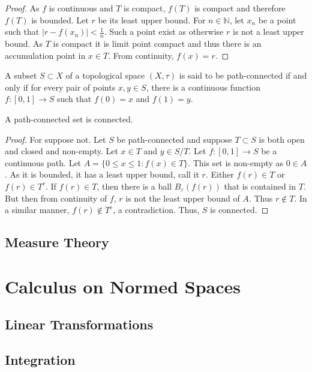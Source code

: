 \documentclass[crop=false,class=book,oneside]{standalone}
\begin{document}
            \begin{proof}
            As $f$ is continuous and $T$ is compact, $f(T)$ is compact and therefore $f(T)$ is bounded. Let $r$ be its least upper bound. For $n\in \mathbb{N}$, let $x_n$ be a point such that $|r-f(x_n)|< \frac{1}{n}$. Such a point exist as otherwise $r$ is not a least upper bound. As $T$ is compact it is limit point compact and thus there is an accumulation point in $x\in T$. From continuity, $f(x) = r$.
            \end{proof}
            \begin{definition}
            A subset $S\subset X$ of a topological space $(X,\tau)$ is said to be path-connected if and only if for every pair of points $x,y\in S$, there is a continuous function $f:[0,1]\rightarrow S$ such that $f(0)=x$ and $f(1)=y$.
            \end{definition}
            \begin{theorem}
            A path-connected set is connected.
            \end{theorem}
            \begin{proof}
            For suppose not. Let $S$ be path-connected and suppose $T\subset S$ is both open and closed and non-empty. Let $x\in T$ and $y\in S/T$. Let $f:[0,1]\rightarrow S$ be a continuous path. Let $A =\{0\leq x \leq 1: f(x) \in T\}$. This set is non-empty as $0\in A$. As it is bounded, it has a least upper bound, call it $r$. Either $f(r)\in T$ or $f(r)\in T^c$. If $f(r)\in T$, then there is a ball $B_{\varepsilon}(f(r))$ that is contained in $T$. But then from continuity of $f$, $r$ is not the least upper bound of $A$. Thus $r\notin T$. In a similar manner, $f(r)\notin T^c$, a contradiction. Thus, $S$ is connected.
            \end{proof}
        \subsection{Measure Theory}
    \section{Calculus on Normed Spaces}
        \subsection{Linear Transformations}
        \subsection{Integration}
\end{document}
